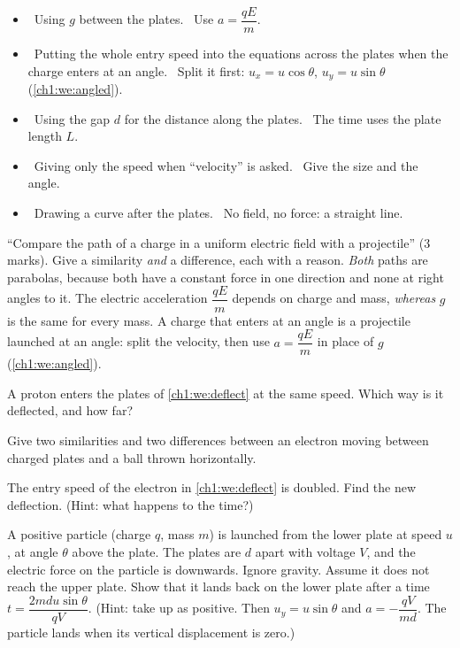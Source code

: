 \begin{mistakes}
\begin{itemize}
  \item \xmark\ Using $g$ between the plates. \cmark\ Use $a = \dfrac{qE}{m}$.
  \item \xmark\ Putting the whole entry speed into the equations across the plates
        when the charge enters at an angle. \cmark\ Split it first:
        $u_x = u\cos\theta$, $u_y = u\sin\theta$ (\cref{ch1:we:angled}).
  \item \xmark\ Using the gap $d$ for the distance along the plates.
        \cmark\ The time uses the plate length $L$.
  \item \xmark\ Giving only the speed when ``velocity'' is asked. \cmark\ Give
        the size and the angle.
  \item \xmark\ Drawing a curve after the plates. \cmark\ No field, no force:
        a straight line.
\end{itemize}
\end{mistakes}

\begin{examtip}
``Compare the path of a charge in a uniform electric field with a projectile''
(3 marks). Give a similarity \emph{and} a difference, each with a reason.
\emph{Both} paths are parabolas, because both have a constant force in one
direction and none at right angles to it. The electric acceleration
$\dfrac{qE}{m}$ depends on charge and mass, \emph{whereas} $g$ is the same for
every mass.
A charge that enters at an angle is a projectile launched at an angle: split the
velocity, then use $a = \dfrac{qE}{m}$ in place of $g$ (\cref{ch1:we:angled}).
\end{examtip}

\begin{quickcheck}
  \item A proton enters the plates of \cref{ch1:we:deflect} at the same speed.
        Which way is it deflected, and how far?
  \item Give two similarities and two differences between an electron moving
        between charged plates and a ball thrown horizontally.
  \item The entry speed of the electron in \cref{ch1:we:deflect} is doubled.
        Find the new deflection. (Hint: what happens to the time?)
  \item A positive particle (charge $q$, mass $m$) is launched from the lower
        plate at speed $u$, at angle $\theta$ above the plate. The plates are $d$
        apart with voltage $V$, and the electric force on the particle is
        downwards. Ignore gravity. Assume it does not reach the upper plate.
        Show that it lands back on the lower plate after a time
        $t = \dfrac{2mdu\sin\theta}{qV}$. (Hint: take up as positive. Then
        $u_y = u\sin\theta$ and $a = -\dfrac{qV}{md}$. The particle lands when
        its vertical displacement is zero.)
\end{quickcheck}

